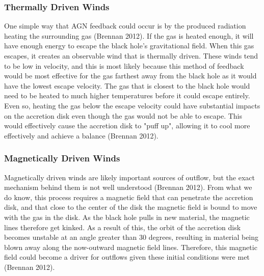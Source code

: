 \documentclass[12pt]{article}
\begin{document}
    \subsubsection{Thermally Driven Winds}
    One simple way that AGN feedback could occur is by the produced radiation
    heating the surrounding gas (Brennan 2012).  If the gas is heated enough,
    it will have
    enough energy to escape the black hole's gravitational field.  When this gas
    escapes, it creates an observable wind that is thermally driven.  These
    winds tend to be low in velocity, and this is most likely because this
    method of feedback would be most effective for the gas farthest away from
    the black hole as it would have the lowest escape velocity.  The gas that is
    closest to the black hole would need to be heated to much higher
    temperatures before it could escape entirely.  Even so, heating the gas
    below the escape velocity could have substantial impacts on the accretion
    disk even though the gas would not be able to escape.  This would
    effectively cause the accretion disk to "puff up", allowing it to cool more
    effectively and achieve a balance (Brennan 2012).

    \subsubsection{Magnetically Driven Winds}
    Magnetically driven winds are likely important sources of outflow, but
    the exact mechanism behind them is not well understood (Brennan 2012).
    From what we do
    know, this process requires a magnetic field that can penetrate the
    accretion disk, and that close to the center of the disk the magnetic field
    is bound to move with the gas in the disk.  As the black hole pulls in new
    material, the magnetic lines therefore get kinked.  As a result of this, the
    orbit of the accretion disk becomes unstable at an angle greater than 30
    degrees, resulting in material being blown away along the now-outward
    magnetic field lines.  Therefore, this magnetic field could become a driver
    for outflows given these initial conditions were met (Brennan 2012).
\end{document}
